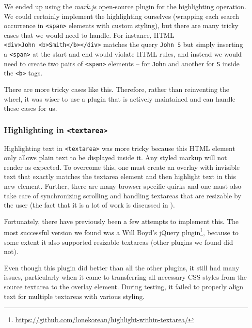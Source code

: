 \documentclass[bsc,frontabs,twoside,singlespacing,parskip,deptreport]{infthesis}
\begin{document}
We ended up using the \textit{mark.js} \cite{A23} open-source plugin for the highlighting operation. We could certainly implement the highlighting ourselves (wrapping each search occurrence in \texttt{\textless{}span\textgreater{}} elements with custom styling),
but there are many tricky cases that we would need to handle. For
instance, HTML \texttt{\textless{}div\textgreater{}John\ \textless{}b\textgreater{}Smith\textless{}/b\textgreater{}\textless{}/div\textgreater{}} matches the query \texttt{John\ S} but simply inserting a \texttt{\textless{}span\textgreater{}} at the start and end would violate HTML rules, and instead we would need to create two pairs of \texttt{\textless{}span\textgreater{}} elements -- for \texttt{John} and another for \texttt{S} inside the \texttt{\textless{}b\textgreater{}} tags.

There are more tricky cases like this. Therefore, rather than
reinventing the wheel, it was wiser to use a plugin that is actively
maintained and can handle these cases for us.

\subsubsection{Highlighting in \texttt{\textless{}textarea\textgreater{}}}
Highlighting text in \texttt{\textless{}textarea\textgreater{}} was more tricky because this HTML element only allows plain text to be displayed inside it. Any styled markup will not render as expected. To overcome this, one must create an overlay with invisible text that exactly matches the textarea element and then highlight text in this new element. Further, there are many browser-specific quirks and one must also take care of synchronizing scrolling and handling textareas that are resizable by the user (the fact that it is a lot of work is discussed in \cite{A24}).

Fortunately, there have previously been a few attempts to implement this. The most successful version we found was a Will Boyd's jQuery plugin\footnote{\url{https://github.com/lonekorean/highlight-within-textarea/}}, because to some extent it also supported resizable textareas (other plugins we found did not).

Even though this plugin did better than all the other plugins, it still had many issues, particularly when it came to transferring all necessary CSS styles from the source textarea to the overlay element. During testing, it failed to properly align text for multiple textareas with various styling.
\end{document}

